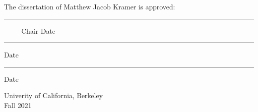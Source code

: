\MyDoubleSpacing

\begin{minipage}{0.85\linewidth}
  \begin{center}
    The dissertation of Matthew Jacob Kramer is approved:

    \vspace{3.5\baselineskip}
    \hrule\vspace{0.25\baselineskip}
    {\small\ \ \ \ \ Chair \hfill Date}
    \vspace{3\baselineskip}
    \hrule\vspace{0.25\baselineskip}
    {\small\hfill Date}
    \vspace{3\baselineskip}
    \hrule\vspace{0.25\baselineskip}
    {\small\hfill Date}
    \vspace{2.5\baselineskip}   %

    Univerity of California, Berkeley\\
    \vspace{1.5\baselineskip}
    Fall 2021
  \end{center}
\end{minipage}

\clearpage
